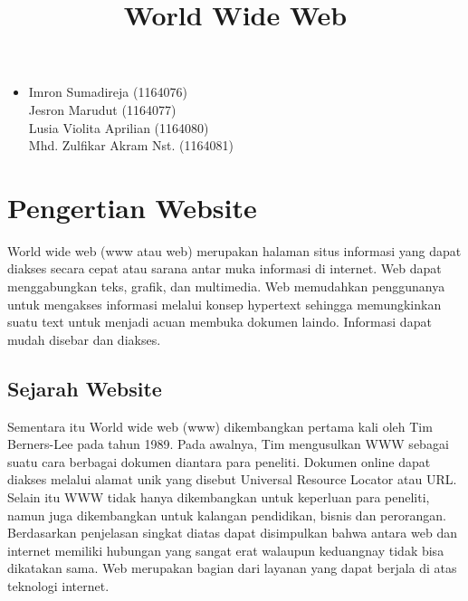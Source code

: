 \documentclass[12pt, a4paper]{article}
\begin{document}
\title{World Wide Web}
\maketitle

\begin{itemize}
\item
	Imron Sumadireja (1164076) \\
	Jesron Marudut (1164077) \\
	Lusia Violita Aprilian (1164080) \\
	Mhd. Zulfikar Akram Nst. (1164081) \\
\end{itemize}

\section{Pengertian Website}
World wide web (www atau web) merupakan halaman situs informasi yang dapat diakses secara cepat atau sarana
antar muka informasi di internet. Web dapat menggabungkan teks, grafik, dan multimedia. Web memudahkan
penggunanya untuk mengakses informasi melalui konsep hypertext sehingga memungkinkan  suatu text untuk
menjadi acuan membuka dokumen laindo. Informasi dapat mudah disebar dan diakses.

\subsection{Sejarah Website}
Sementara itu World wide web (www) dikembangkan pertama kali oleh Tim Berners-Lee pada tahun 1989. Pada
awalnya, Tim mengusulkan WWW sebagai suatu cara berbagai dokumen diantara para peneliti. Dokumen online dapat
diakses melalui alamat unik yang disebut Universal Resource Locator atau URL. Selain itu WWW tidak hanya
dikembangkan untuk keperluan para peneliti, namun juga dikembangkan untuk kalangan pendidikan, bisnis dan
perorangan. Berdasarkan penjelasan singkat diatas dapat disimpulkan bahwa antara web dan internet memiliki
hubungan yang sangat erat walaupun keduangnay tidak bisa dikatakan sama. Web merupakan bagian dari layanan
yang dapat berjala di atas teknologi internet.
\end{document}
